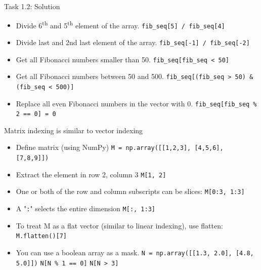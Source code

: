 \begin{frame}[fragile]{Task 1.2: Solution}
\begin{itemize}
    \item Divide 6\textsuperscript{th} and 5\textsuperscript{th} element of the array.
    \newline \lstinline{fib_seq[5] / fib_seq[4]}
    \item Divide last and 2nd last element of the array. 
    \newline \lstinline{fib_seq[-1] / fib_seq[-2]}
    \item Get all Fibonacci numbers smaller than 50.
    \newline \lstinline{fib_seq[fib_seq < 50]}
     \item Get all Fibonacci numbers between 50 and 500.
    \newline \lstinline{fib_seq[(fib_seq > 50) & (fib_seq < 500)]}
    \item Replace all even Fibonacci numbers in the vector with 0.
    \newline \lstinline{fib_seq[fib_seq % 2 == 0] = 0}
\end{itemize}
\end{frame}

\begin{frame}[fragile]{Matrix indexing is similar to vector indexing}
\small
\begin{itemize}
    \item Define matrix (using NumPy)
    \newline \lstinline{M = np.array([[1,2,3], [4,5,6], [7,8,9]])}
    \item Extract the element in row 2, column 3
    \newline \lstinline{M[1, 2]} 
    \item One or both of the row and column subscripts can be slices:
    \newline \lstinline{M[0:3, 1:3]}
    \item A  "\lstinline{:}" selects the entire dimension
    \newline \lstinline{M[:, 1:3]}
    \item To treat M as a flat vector (similar to linear indexing), use flatten:
    \newline \lstinline{M.flatten()[7]}
    \item You can use a boolean array as a mask.
    \newline \lstinline{N = np.array([[1.3, 2.0], [4.8, 5.0]])}
    \newline \lstinline{N[N % 1 == 0]} 
    \newline \lstinline{N[N > 3]}
\end{itemize}
\end{frame}


